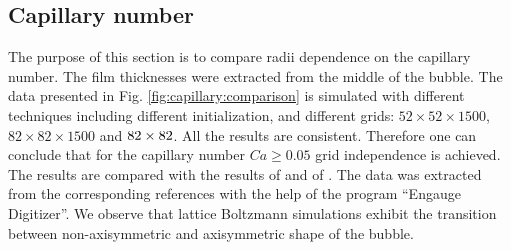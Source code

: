 \documentclass{article}
\begin{document}
\subsection{Capillary number}
The purpose of this section is to compare radii dependence on the capillary number. The film
thicknesses were extracted from the middle of the bubble. The data presented in Fig.
\ref{fig:capillary:comparison} is simulated with different techniques including different
initialization, and different grids: $52 \times 52 \times 1500$, $82 \times 82 \times 1500$ and $82
\times 82 \time 2400$. All the results are consistent. Therefore one can conclude that for the
capillary number $Ca\geq
0.05$ grid independence is achieved. The results are compared with the results of
\citet{heil-threedim} and of \citet{wang-non-circular}. The data was extracted from the
corresponding references with the help of the program ``Engauge Digitizer''. We observe that
lattice Boltzmann simulations exhibit 
the transition between non-axisymmetric and axisymmetric shape of the bubble. 
\end{document}
